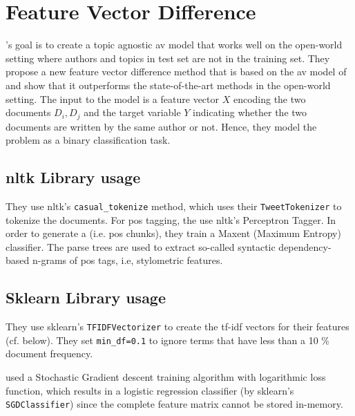 \section{Feature Vector Difference}
\label{sec:feature_vector_difference}

\citet{weerasinghe_feature_vector_difference_2021}'s goal is to create a topic agnostic \ac{av} model that works well on the open-world setting 
where authors and topics in test set are not in the training set. They propose a new feature vector difference method that is based on the \ac{av} model of \citet{stamatatos_2020} and show that it outperforms the state-of-the-art methods in the open-world setting.
The input to the model is a feature vector $X$ encoding the two documents $D_i,D_j$ 
and the target variable $Y$ indicating whether the two documents are written by the same author or not. 
Hence, they model the problem as a binary classification task.

\subsection{\ac{nltk} Library usage}
They use \ac{nltk}'s \texttt{casual\_tokenize} method, which uses their \texttt{TweetTokenizer} to tokenize the documents.
For \ac{pos} tagging, the use \ac{nltk}'s Perceptron Tagger.
In order to generate a  (i.e. \ac{pos} chunks), they train a Maxent (Maximum Entropy) classifier.
The parse trees are used to extract so-called syntactic dependency-based n-grams of \ac{pos} tags, i.e, stylometric features.

\subsection{Sklearn Library usage}
They use \ac{sklearn}'s \texttt{TFIDFVectorizer} to create the \ac{tf-idf} vectors for their features (cf. below).
They set \texttt{min\_df=0.1} to ignore terms that have less than a 10 \% document frequency.

\citet{weerasinghe_feature_vector_difference_2021} used a Stochastic Gradient descent training algorithm with logarithmic loss function, 
which results in a logistic regression classifier (by sklearn's  \texttt{SGDClassifier}) since the complete feature matrix cannot be stored in-memory.


